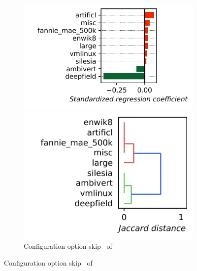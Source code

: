 \begin{figure}
	\begin{subfigure}{0.99\linewidth}
		\begin{minipage}{0.5\linewidth}
			\includegraphics[width=\linewidth]{images/plots/kanzi_skip_influences.pdf}
		\end{minipage}
		\begin{minipage}{0.5\linewidth}
			\includegraphics[width=0.9\linewidth]{images/plots/kanzi_skip_workloads.pdf}
		\end{minipage}
		\caption{Configuration option \guillemotleft\textsf{skip}\guillemotright~ of \kanzi}
		\label{fig:results_rq3_kanzi}
	\end{subfigure}


\end{figure}
